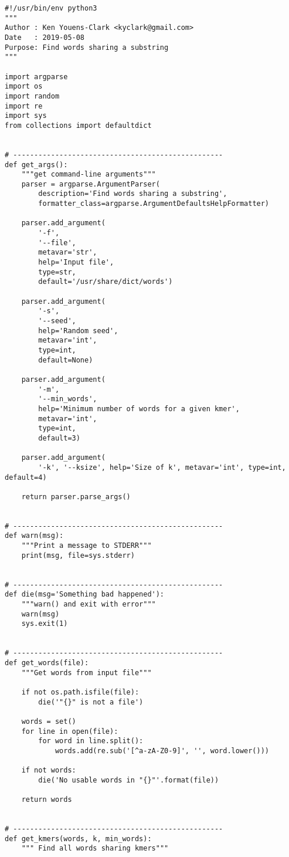 \documentclass[]{article}
\begin{document}
\begin{verbatim}
#!/usr/bin/env python3
"""
Author : Ken Youens-Clark <kyclark@gmail.com>
Date   : 2019-05-08
Purpose: Find words sharing a substring
"""

import argparse
import os
import random
import re
import sys
from collections import defaultdict


# --------------------------------------------------
def get_args():
    """get command-line arguments"""
    parser = argparse.ArgumentParser(
        description='Find words sharing a substring',
        formatter_class=argparse.ArgumentDefaultsHelpFormatter)

    parser.add_argument(
        '-f',
        '--file',
        metavar='str',
        help='Input file',
        type=str,
        default='/usr/share/dict/words')

    parser.add_argument(
        '-s',
        '--seed',
        help='Random seed',
        metavar='int',
        type=int,
        default=None)

    parser.add_argument(
        '-m',
        '--min_words',
        help='Minimum number of words for a given kmer',
        metavar='int',
        type=int,
        default=3)

    parser.add_argument(
        '-k', '--ksize', help='Size of k', metavar='int', type=int, default=4)

    return parser.parse_args()


# --------------------------------------------------
def warn(msg):
    """Print a message to STDERR"""
    print(msg, file=sys.stderr)


# --------------------------------------------------
def die(msg='Something bad happened'):
    """warn() and exit with error"""
    warn(msg)
    sys.exit(1)


# --------------------------------------------------
def get_words(file):
    """Get words from input file"""

    if not os.path.isfile(file):
        die('"{}" is not a file')

    words = set()
    for line in open(file):
        for word in line.split():
            words.add(re.sub('[^a-zA-Z0-9]', '', word.lower()))

    if not words:
        die('No usable words in "{}"'.format(file))

    return words


# --------------------------------------------------
def get_kmers(words, k, min_words):
    """ Find all words sharing kmers"""


\end{verbatim}
\end{document}
